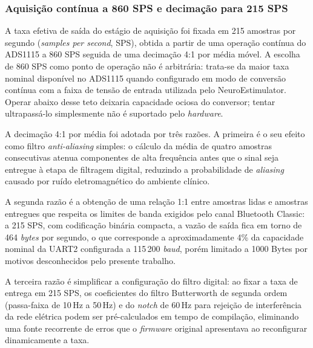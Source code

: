 \subsubsection{Aquisição contínua a 860 SPS e decimação para 215 SPS}\label{subsubsec:NEDecimacao}

A taxa efetiva de saída do estágio de aquisição foi fixada em 215 amostras por segundo (\textit{samples per second}, SPS), obtida a partir de uma operação contínua do ADS1115 a 860 SPS seguida de uma decimação 4:1 por média móvel. A escolha de 860 SPS como ponto de operação não é arbitrária: trata-se da maior taxa nominal disponível no ADS1115 quando configurado em modo de conversão contínua com a faixa de tensão de entrada utilizada pelo NeuroEstimulator. Operar abaixo desse teto deixaria capacidade ociosa do conversor; tentar ultrapassá-lo simplesmente não é suportado pelo \textit{hardware}.

A decimação 4:1 por média foi adotada por três razões. A primeira é o seu efeito como filtro \textit{anti-aliasing} simples: o cálculo da média de quatro amostras consecutivas atenua componentes de alta frequência antes que o sinal seja entregue à etapa de filtragem digital, reduzindo a probabilidade de \textit{aliasing} causado por ruído eletromagnético do ambiente clínico. 

A segunda razão é a obtenção de uma relação 1:1 entre amostras lidas e amostras entregues que respeita os limites de banda exigidos pelo canal Bluetooth Classic: a 215 SPS, com codificação binária compacta, a vazão de saída fica em torno de 464 \textit{bytes} por segundo, o que corresponde a aproximadamente 4\% da capacidade nominal da UART2 configurada a 115\,200 \textit{baud}, porém limitado a 1000 Bytes por motivos desconhecidos pelo presente trabalho. 

A terceira razão é simplificar a configuração do filtro digital: ao fixar a taxa de entrega em 215 SPS, os coeficientes do filtro Butterworth de segunda ordem (passa-faixa de 10\,Hz a 50\,Hz) e do \textit{notch} de 60\,Hz para rejeição de interferência da rede elétrica podem ser pré-calculados em tempo de compilação, eliminando uma fonte recorrente de erros que o \textit{firmware} original apresentava ao reconfigurar dinamicamente a taxa.

